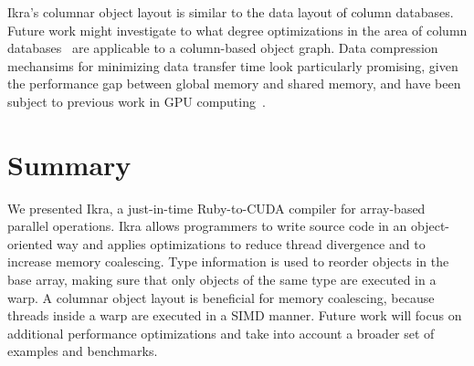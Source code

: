 \documentclass[preprint]{sigplanconf}
\begin{document}
Ikra's columnar object layout is similar to the data layout of column databases. Future work might investigate to what degree optimizations in the area of column databases~\cite{DBLP:journals/ftdb/AbadiBHIM13, DBLP:journals/corr/LinMPS16} are applicable to a column-based object graph. Data compression mechansims for minimizing data transfer time look particularly promising, given the performance gap between global memory and shared memory, and have been subject to previous work in GPU computing~\cite{Patel:2012:PLD, Przymus2012}.


\section{Summary}
We presented Ikra, a just-in-time Ruby-to-CUDA compiler for array-based parallel operations. Ikra allows programmers to write source code in an object-oriented way and applies optimizations to reduce thread divergence and to increase memory coalescing. Type information is used to reorder objects in the base array, making sure that only objects of the same type are executed in a warp. A columnar object layout is beneficial for memory coalescing, because threads inside a warp are executed in a SIMD manner. Future work will focus on additional performance optimizations and take into account a broader set of examples and benchmarks.


\balance


\end{document}
